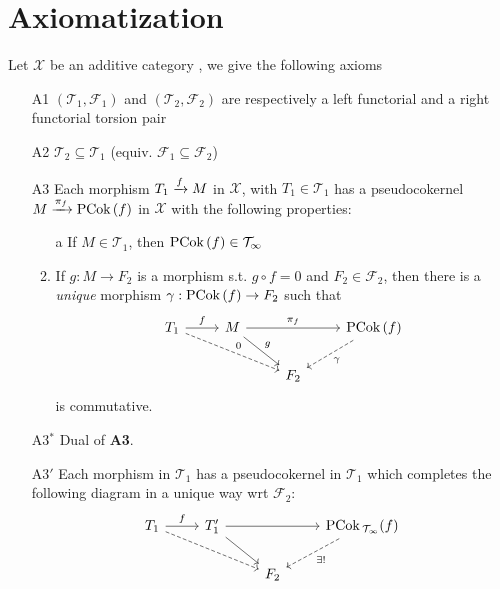 \clearpage

\section{Axiomatization}

Let $\mathcal{X}$ be an additive category , we give the following axioms

\begin{enumerate}
  \item[A1] $(\mathcal{T}_1,\mathcal{F}_1)$ and $(\mathcal{T}_2,\mathcal{F}_2)$ are respectively a left functorial and a
  right functorial torsion pair 
  \item[A2] $\mathcal{T}_2\subseteq \mathcal{T}_1$ (equiv. $\mathcal{F}_1\subseteq\mathcal{F}_2$)
  \item[A3] Each morphism $T_1\xrightarrow{f}M$ in $\mathcal{X}$, with $T_1\in\mathcal{T}_1$ has a pseudocokernel
  $M\xrightarrow{\pi_f}\mathrm{\textup{PCok\,}} (f)$ in $\mathcal{X}$ with the following properties:
  \begin{enumerate}
    \item[a] If $M\in\mathcal{T}_1$, then $\mathrm{\textup{PCok\,}}(f) \in\mathcal{T_1}$
    \item If $g:M\to F_2$ is a morphism s.t. $g\circ f=0$ and $F_2\in\mathcal{F}_2$, then there is a
    \emph{unique} morphism $\gamma:\mathrm{\textup{PCok\,}}(f)\to F_2$ such that
    \begin{equation*}
      \begin{tikzcd}
        T_1\arrow{r}{f}\arrow[dashed]{drr}{0}
          & M\arrow{rr}{\pi_f}\arrow{dr}{g}
            & & \PCok(f)\arrow[dashed]{dl}{\gamma} \\
          & & F_2
              &
      \end{tikzcd}
    \end{equation*}
    is commutative.
  \end{enumerate}
  \item[A3$^*$] Dual of \textbf{A3}.
  \item[A3$'$] Each morphism in $\mathcal{T}_1$ has a pseudocokernel in $\mathcal{T}_1$ which completes the following
  diagram in a unique way wrt $\mathcal{F}_2$:
  \begin{equation*}
    \begin{tikzcd}
      T_1\arrow{r}{f}\arrow[dashed]{drr}
        & T_1'\arrow{dr}\arrow{rr}
          & & \PCok_\mathcal{T_1}(f)\arrow[dashed]{dl}{\exists!} \\
        & & F_2
            &
    \end{tikzcd}
  \end{equation*}
\end{enumerate}
